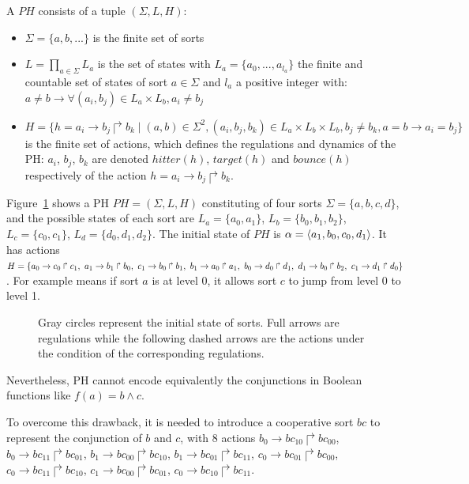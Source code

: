\begin{definition}
A $PH$ consists of a tuple $(\Sigma, L, H)$:
\begin{itemize}
    \item $\Sigma=\{a,b,...\}$ is the finite set of sorts
    \item $L=\prod_{a\in\Sigma}{L_a}$ is the set of states with $L_a=\{a_0,...,a_{l_a}\}$ the finite and countable set of states of sort $a\in\Sigma$ and $l_a$ a positive integer with: $a\neq b\to \forall(a_i,b_j)\in L_a\times L_b,a_i\neq b_j$
    \item $H=\{h=a_i\to b_j\Rsh b_k\mid(a,b)\in\Sigma^2, (a_i,b_j,b_k)\in L_a\times L_b\times L_b,b_j\neq b_k, a=b\to a_i=b_j\}$ is the finite set of actions, which defines the regulations and dynamics of the PH: $a_i$, $b_j$, $b_k$ are denoted $hitter(h)$, $target(h)$ and $bounce(h)$ respectively of the action $h=a_i\to b_j\Rsh b_k$.
\end{itemize}
\end{definition}

\begin{example}
Figure~\ref{fig:PH} shows a PH $PH=(\Sigma, L, H)$ constituting of four sorts $\Sigma=\{a,b,c,d\}$, and the possible states of each sort are $L_a=\{a_0,a_1\}$, $L_b=\{b_0,b_1,b_2\}$, $L_c=\{c_0,c_1\}$, $L_d=\{d_0,d_1,d_2\}$.
The initial state of $PH$ is $\alpha=\langle a_1,b_0,c_0,d_1\rangle$. 
It has actions $H=\{\acmph{a_0}{c_0}{c_1},\ \acmph{a_1}{b_1}{b_0},\ \acmph{c_1}{b_0}{b_1},\ \acmph{b_1}{a_0}{a_1},\ \acmph{b_0}{d_0}{d_1},\ \acmph{d_1}{b_0}{b_2},\ \acmph{c_1}{d_1}{d_0}\}$. 
For example  means if sort $a$ is at level 0, it allows sort $c$ to jump from level 0 to level 1.

\end{example}

\begin{figure}[ht]
\centering

\caption[Process Hitting]{Gray circles represent the initial state of sorts.
Full arrows are regulations while the following dashed arrows are the actions under the condition of the corresponding regulations.}\label{fig:PH}
\end{figure}

Nevertheless, PH cannot encode equivalently the conjunctions in Boolean functions like $f(a)=b\land c$.

To overcome this drawback, it is needed to introduce a cooperative sort $bc$ to represent the conjunction of $b$ and $c$, with 8 actions $b_0\to bc_{10}\Rsh bc_{00}$, $b_0\to bc_{11}\Rsh bc_{01}$, $b_1\to bc_{00}\Rsh bc_{10}$, $b_1\to bc_{01}\Rsh bc_{11}$, $c_0\to bc_{01}\Rsh bc_{00}$, $c_0\to bc_{11}\Rsh bc_{10}$, $c_1\to bc_{00}\Rsh bc_{01}$, $c_0\to bc_{10}\Rsh bc_{11}$.

